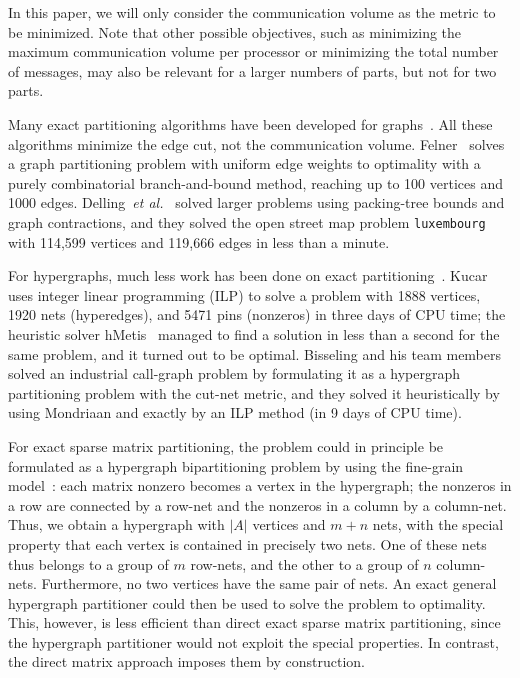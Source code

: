 In this paper, we will only consider the communication volume
as the metric to be minimized. 
Note that other possible objectives, such as 
minimizing the maximum communication volume per processor
or minimizing the total number of messages, 
may also be relevant for a larger numbers of parts,
but not for two parts.

Many exact partitioning algorithms have been developed for graphs~\cite{karisch00,sensen01,felner05,hager13,delling14}. All these algorithms minimize the edge cut,
not the communication volume.
Felner~\cite{felner05} solves a graph partitioning problem
with uniform edge weights to optimality
with a purely combinatorial branch-and-bound method,
reaching up to 100 vertices and 1000 edges.
Delling~\textit{et al.\ }\cite{delling14} solved larger problems
using packing-tree bounds and graph contractions, and they solved 
the open street map problem \allowbreak\texttt{luxembourg} with
114,599 vertices and 119,666 edges in less than a minute.

For hypergraphs, much less work has been
done on exact partitioning~\cite{caldwell00,kucar04,bisseling05}.
Kucar~\cite{kucar04} uses integer linear programming (ILP) 
to solve a problem with 1888 vertices, 1920 nets (hyperedges), and 5471
pins (nonzeros) in three days of CPU time; the heuristic solver
hMetis~\cite{karypis99b}
managed to find a solution in less than a second for the same problem,
and it turned out to be optimal.
Bisseling and his team members~\cite{bisseling05}
solved an industrial call-graph problem
by formulating it as a hypergraph partitioning problem with the cut-net metric,
and they solved it heuristically by using Mondriaan
and exactly by an ILP method (in 9 days of CPU time).

For exact sparse matrix partitioning,
the problem could in principle be formulated
as a hypergraph bipartitioning problem by using
the fine-grain model~\cite{catalyurek01}:
each matrix nonzero becomes a vertex in the hypergraph;
the nonzeros in a row are connected by a row-net  
and the nonzeros in a column by a column-net.
Thus, we obtain a hypergraph with $|A|$ vertices and $m+n$ nets,
with the special property that each vertex is
contained in precisely two nets.
One of these nets thus belongs to a group of $m$ row-nets, and the other to
a group of $n$ column-nets. Furthermore, no two vertices have the same pair
of nets.
An exact general hypergraph partitioner could then be used to solve
the problem to optimality. 
This, however, is less efficient than direct exact sparse matrix partitioning,
since the hypergraph partitioner would not exploit the special properties.
In contrast, the direct matrix approach imposes them
by construction.

